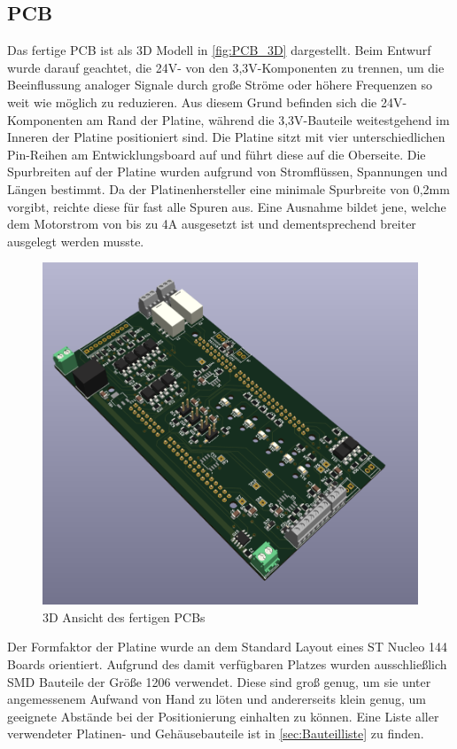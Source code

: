 \subsection{\ac{PCB}}
Das fertige PCB ist als 3D Modell in \autoref{fig:PCB_3D} dargestellt. Beim Entwurf wurde darauf geachtet, die 24V- von den 3,3V-Komponenten zu trennen, um die Beeinflussung analoger Signale durch große Ströme oder höhere Frequenzen so weit wie möglich zu reduzieren. Aus diesem Grund befinden sich die 24V-Komponenten am Rand der Platine, während die 3,3V-Bauteile weitestgehend im Inneren der Platine positioniert sind. Die Platine sitzt mit vier unterschiedlichen Pin-Reihen am Entwicklungsboard auf und führt diese auf die Oberseite. Die Spurbreiten auf der Platine wurden aufgrund von Stromflüssen, Spannungen und Längen bestimmt. Da der Platinenhersteller eine minimale Spurbreite von 0,2mm vorgibt, reichte diese für fast alle Spuren aus. Eine Ausnahme bildet jene, welche dem Motorstrom von bis zu 4A ausgesetzt ist und dementsprechend breiter ausgelegt werden musste. 
\begin{figure}[H]
	\centering
	\includegraphics[width=1.0\textwidth]{images/Hardware/Platine_Fertig_3D_ansicht(1).PNG}
	\caption{3D Ansicht des fertigen PCBs}
	\label{fig:PCB_3D}
\end{figure}
Der Formfaktor der Platine wurde an dem Standard Layout eines ST Nucleo 144 Boards orientiert. Aufgrund des damit verfügbaren Platzes wurden ausschließlich \ac{SMD} Bauteile der Größe 1206 verwendet. Diese sind groß genug, um sie unter angemessenem Aufwand von Hand zu löten und andererseits klein genug, um geeignete Abstände bei der Positionierung einhalten zu können. Eine Liste aller verwendeter Platinen- und Gehäusebauteile ist in \autoref{sec:Bauteilliste} zu finden.

